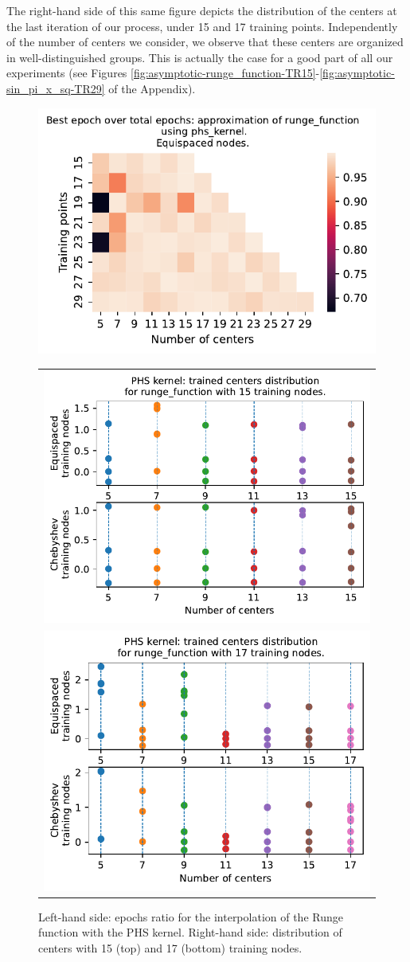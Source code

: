 \documentclass[12pt]{report} %
\begin{document}
The right-hand side of this same figure depicts the distribution of the centers at the last iteration of our process, under 15 and 17 training points. Independently of the number of centers we consider, we observe that these centers are organized in well-distinguished groups. This is actually the case for a good part of all our experiments (see Figures \ref{fig:asymptotic-runge_function-TR15}-\ref{fig:asymptotic-sin_pi_x_sq-TR29} of the Appendix).

\begin{figure}[ht]
    \centering
\includegraphics[width=.49\textwidth, align=c]{imagenes/experiments/1d/variational_epochs/runge_function-Kphs_kernel-Equi-epochs.pdf}
\begin{tabular}{l}
\includegraphics[width=.45\textwidth, trim={0 4.47cm 0 0}, clip=true]{imagenes/experiments/1d/phs_nodes_asymptotic/runge_function_TR15.pdf}\\
\includegraphics[width=.45\textwidth, trim={0 4.47cm 0 0}, clip=true]{imagenes/experiments/1d/phs_nodes_asymptotic/runge_function_TR17.pdf}
\end{tabular}

\caption{Left-hand side: epochs ratio for the interpolation of the Runge function with the PHS kernel. Right-hand side: distribution of centers with 15 (top) and 17 (bottom) training nodes.}
    \label{fig:epochs-runge-phs-show}
\end{figure}
\end{document}
